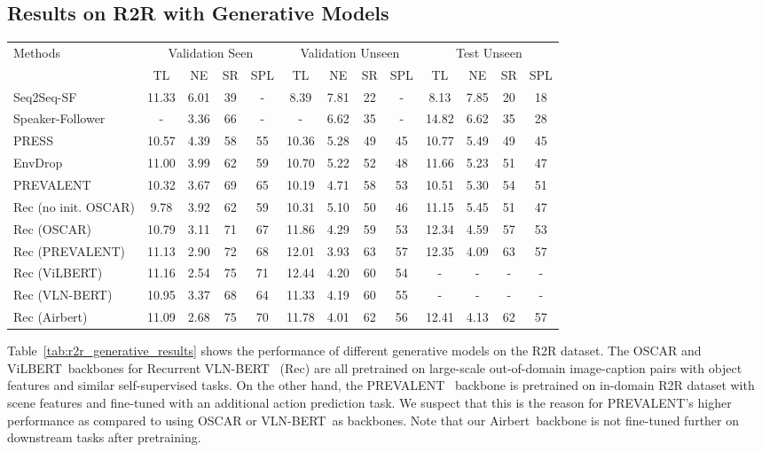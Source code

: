 \RequirePackage[dvipsnames,table]{xcolor} \documentclass[10pt,twocolumn,letterpaper]{article}
\newcommand{\vilbert}{ViLBERT}
\newcommand{\vlnbert}{VLN-BERT}
\newcommand{\airbert}{Airbert}
\begin{document}
\subsection{Results on R2R with Generative Models}
\begin{table*}
	\small
	\centering
\begin{tabular}{l|cccc|cccc|cccc} \toprule
		\multirow{2}{*}{Methods} & \multicolumn{4}{c|}{Validation Seen} & \multicolumn{4}{c|}{Validation Unseen} & \multicolumn{4}{c}{Test Unseen} \\
		& TL & NE & SR & SPL & TL & NE & SR & SPL & TL & NE & SR & SPL \\ \midrule
		Seq2Seq-SF \cite{anderson2018r2r} & 11.33 & 6.01 & 39 & - & 8.39 & 7.81 & 22 & - & 8.13 & 7.85 & 20 & 18 \\
		Speaker-Follower \cite{fried2018speaker} & - & 3.36 & 66 & - & - & 6.62 & 35 & - & 14.82 & 6.62 & 35 & 28 \\
		PRESS \cite{li2019press} & 10.57 & 4.39 & 58 & 55 & 10.36 & 5.28 & 49 & 45 & 10.77 & 5.49 & 49 & 45 \\
		EnvDrop \cite{tan2019envdrop} & 11.00 & 3.99 & 62 & 59 & 10.70 & 5.22 & 52 & 48 & 11.66 & 5.23 & 51 & 47 \\
		PREVALENT \cite{hao2020prevalent} & 10.32 & 3.67 & 69 & 65 & 10.19 & 4.71 & 58 & 53 & 10.51 & 5.30 & 54 & 51 \\
		Rec (no init. OSCAR) \cite{hong2021recurrentvln} & 9.78 & 3.92 & 62 & 59 & 10.31 & 5.10 & 50 & 46 & 11.15 & 5.45 & 51 & 47 \\
		Rec (OSCAR) \cite{hong2021recurrentvln} & 10.79 & 3.11 & 71 & 67 & 11.86 & 4.29 & 59 & 53 & 12.34 & 4.59 & 57 & 53 \\
		Rec (PREVALENT) \cite{hong2021recurrentvln} & 11.13 & 2.90 & 72 & 68 & 12.01 & 3.93 & 63 & 57 & 12.35 & 4.09 & 63 & 57 \\ \midrule
		Rec (\vilbert)  & 11.16 & 2.54 & 75 & 71 & 12.44 & 4.20 & 60 & 54 & - & - & - & - \\
		Rec (\vlnbert) & 10.95 & 3.37 & 68 & 64 & 11.33 & 4.19 & 60 & 55 & - & - & - & - \\
		Rec (\airbert) & 11.09 & 2.68 & 75 & 70 & 11.78 & 4.01 & 62 & 56 & 12.41 & 4.13  & 62 & 57 \\  \bottomrule
	\end{tabular}
	\caption{Navigation performance of different generative models on the R2R dataset.}
	\label{tab:r2r_generative_results}
\end{table*}
 
Table~\ref{tab:r2r_generative_results} shows the performance of different generative models on the R2R dataset.
The OSCAR and \vilbert~backbones for Recurrent VLN-BERT~\cite{hong2021recurrentvln} (Rec) are all pretrained on large-scale out-of-domain image-caption pairs with object features and similar self-supervised tasks.
On the other hand, the PREVALENT~\cite{hao2020prevalent} backbone is pretrained on in-domain R2R dataset with scene features and fine-tuned with an additional action prediction task.
We suspect that this is the reason for PREVALENT's higher performance as compared to using OSCAR or \vlnbert~as backbones.
Note that our \airbert~backbone is not fine-tuned further on downstream tasks after pretraining.
\end{document}
